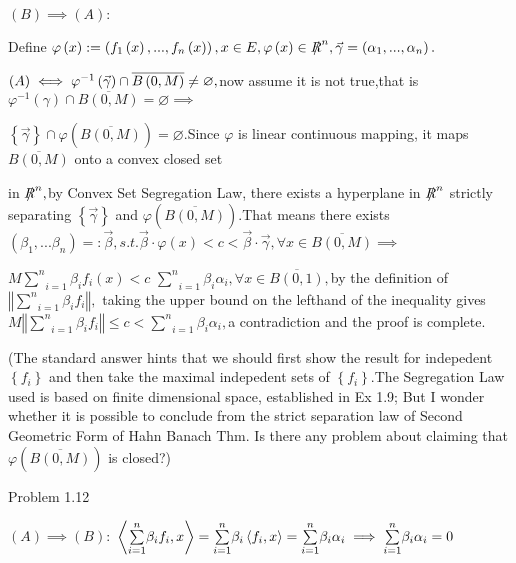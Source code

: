 \documentclass{article}
\begin{document}
$\left( B\right) \implies \left( A\right) :$

\bigskip Define $\varphi \left( x\right) :=\left( f_{1}\left( x\right)
,...,f_{n}\left( x\right) \right) ,x\in E,\varphi \left( x\right) \in \NEG%
{R}^{n},\vec{\gamma}=\left( \alpha _{1},...,\alpha _{n}\right) .$

$\left( A\right) \iff \varphi ^{-1}\left( \vec{\gamma}\right) \cap \overline{%
B\left( 0,M\right) }\neq \varnothing ,$now assume it is not true,that is $%
\varphi ^{-1}\left( \gamma \right) \cap \overline{B\left( 0,M\right) }%
=\varnothing \implies $

$\left\{ \vec{\gamma}\right\} \cap \varphi \left( \overline{B\left(
0,M\right) }\right) =\varnothing .$Since $\varphi $ is linear continuous
mapping, it maps $\overline{B\left( 0,M\right) }$ onto a convex closed set

in $\NEG{R}^{n},$by Convex Set Segregation Law, there exists a hyperplane in 
$\NEG{R}^{n}$ strictly separating $\left\{ \vec{\gamma}\right\} $ and $%
\varphi \left( \overline{B\left( 0,M\right) }\right) .$That means there
exists $\left( \beta _{1},...\beta _{n}\right) =:\vec{\beta},s.t.\vec{\beta}%
\cdot \varphi \left( x\right) <c<\vec{\beta}\cdot \vec{\gamma},\forall x\in 
\overline{B\left( 0,M\right) }\implies $

$M\underset{i=1}{\overset{n}{\sum }}\beta _{i}f_{i}\left( x\right) <c$%
\TEXTsymbol{<}$\underset{i=1}{\overset{n}{\sum }}\beta _{i}\alpha
_{i},\forall x\in \overline{B\left( 0,1\right) },$by the definition of $%
\left\Vert \underset{i=1}{\overset{n}{\sum }}\beta _{i}f_{i}\right\Vert ,$%
taking the upper bound on the lefthand of the inequality gives $M\left\Vert 
\underset{i=1}{\overset{n}{\sum }}\beta _{i}f_{i}\right\Vert \leq c<\underset%
{i=1}{\overset{n}{\sum }}\beta _{i}\alpha _{i},$a contradiction and the
proof is complete.

(The standard answer hints that we should first show the result for
indepedent $\left\{ f_{i}\right\} $ and then take the maximal indepedent
sets of $\left\{ f_{i}\right\} .$The Segregation Law used is based on finite
dimensional space, established in Ex 1.9; But I wonder whether it is
possible to conclude from the strict separation law of Second Geometric Form
of Hahn Banach Thm. Is there any problem about claiming that $\varphi \left( 
\overline{B\left( 0,M\right) }\right) $ is closed?)

Problem 1.12

$\left( A\right) \implies \left( B\right) :$ $\left\langle \underset{i=1}{%
\overset{n}{\sum }}\beta _{i}f_{i},x\right\rangle =\underset{i=1}{\overset{n}%
{\sum }}\beta _{i}\left\langle f_{i},x\right\rangle =\underset{i=1}{\overset{%
n}{\sum }}\beta _{i}\alpha _{i}\implies \underset{i=1}{\overset{n}{\sum }}%
\beta _{i}\alpha _{i}=0$
\end{document}
